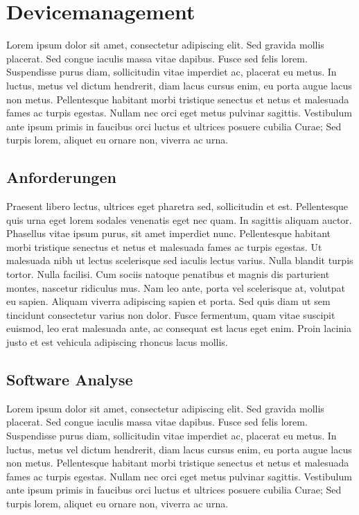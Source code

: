 \chapter{Devicemanagement}

Lorem ipsum dolor sit amet, consectetur adipiscing elit. Sed gravida mollis placerat. Sed congue iaculis massa vitae dapibus. Fusce sed felis lorem. Suspendisse purus diam, sollicitudin vitae imperdiet ac, placerat eu metus. In luctus, metus vel dictum hendrerit, diam lacus cursus enim, eu porta augue lacus non metus. Pellentesque habitant morbi tristique senectus et netus et malesuada fames ac turpis egestas. Nullam nec orci eget metus pulvinar sagittis. Vestibulum ante ipsum primis in faucibus orci luctus et ultrices posuere cubilia Curae; Sed turpis lorem, aliquet eu ornare non, viverra ac urna.

\section{Anforderungen}

Praesent libero lectus, ultrices eget pharetra sed, sollicitudin et est. Pellentesque quis urna eget lorem sodales venenatis eget nec quam. In sagittis aliquam auctor. Phasellus vitae ipsum purus, sit amet imperdiet nunc. Pellentesque habitant morbi tristique senectus et netus et malesuada fames ac turpis egestas. Ut malesuada nibh ut lectus scelerisque sed iaculis lectus varius. Nulla blandit turpis tortor. Nulla facilisi. Cum sociis natoque penatibus et magnis dis parturient montes, nascetur ridiculus mus. Nam leo ante, porta vel scelerisque at, volutpat eu sapien. Aliquam viverra adipiscing sapien et porta. Sed quis diam ut sem tincidunt consectetur varius non dolor. Fusce fermentum, quam vitae suscipit euismod, leo erat malesuada ante, ac consequat est lacus eget enim. Proin lacinia justo et est vehicula adipiscing rhoncus lacus mollis.

\section{Software Analyse}

Lorem ipsum dolor sit amet, consectetur adipiscing elit. Sed gravida mollis placerat. Sed congue iaculis massa vitae dapibus. Fusce sed felis lorem. Suspendisse purus diam, sollicitudin vitae imperdiet ac, placerat eu metus. In luctus, metus vel dictum hendrerit, diam lacus cursus enim, eu porta augue lacus non metus. Pellentesque habitant morbi tristique senectus et netus et malesuada fames ac turpis egestas. Nullam nec orci eget metus pulvinar sagittis. Vestibulum ante ipsum primis in faucibus orci luctus et ultrices posuere cubilia Curae; Sed turpis lorem, aliquet eu ornare non, viverra ac urna.